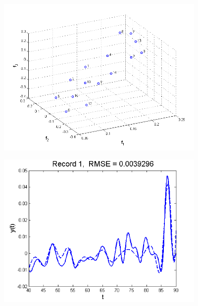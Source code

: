 \documentclass[11pt]{beamer}
\begin{document}
\begin{frame}

\begin{center}
\includegraphics[width=4in]{figs/SelTIC_Scr.png}
\end{center}

\end{frame}


\begin{frame}

\begin{center}
\includegraphics[width=4in]{figs/SelTIC_fit1.png}
\end{center}

\end{frame}

\end{document}
